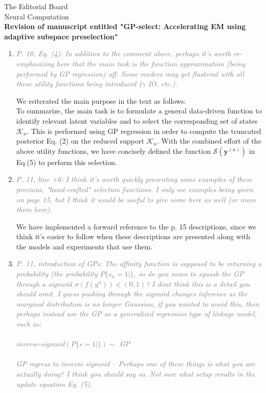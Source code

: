 \documentclass[10pt]{letter}
\newcommand{\rvr}[1]{\textcolor{gray}{#1}}
\renewcommand{\vec}[1]{{\mathbf{#1}}}
\newcommand{\Kn}{\mathcal{K}_{n}}
\begin{document}
\begin{letter}{
The Editorial Board\\
Neural Computation\\
\vspace{10mm}
\textbf{Revision of manuscript entitled "GP-select: Accelerating EM using adaptive
subspace preselection"}
}
\begin{enumerate}[topsep=3pt,itemsep=2ex,partopsep=1ex,parsep=1ex]
For example, let's say that there are five $s_h$, where $h\in \{1,...,5\}$. We consider the case where only $s_1$   and $s_2$   are selected.  The $\mathcal{I}$ function will then return zeros for $s_3$, $s_4$, and $s_5$, but will  return both allowed possibilities $0$ or $1$ for $s_1$ and $s_2$. Thus a valid setting for the entire vector $\vec{s}$ can be $\vec{s}=[0 1 0 0 0]$, but not $\vec{s}=[0 1 1 0 0]$. We have clarified this in the text.

    \item \rvr{\emph{P. 10, Eq. (4): In addition to the comment above, perhaps it's worth re-emphasizing here that the main task is the function approximation (being performed by GP regression) off. Some readers may get flustered with all these utility functions being introduced ($\gamma$ IO, etc.).}}

We reiterated the main purpose in the text as follows:\\
To summarize, the main task is to formulate a general data-driven function to identify relevant latent variables and to select the corresponding set of states
$\Kn$. 
This is performed using GP regression in order to compute the truncated posterior Eq. (2) on the reduced support $\Kn$.
With the combined effort of the above utility functions, we have concisely defined the function $\mathcal{S}(\vec{y}^{(n)})$ in Eq.(5) to perform this selection.

    \item \rvr{\emph{P. 11, line +6: I think it's worth quickly presenting some examples of these previous, "hand-crafted"  selection functions. I only see examples being given on page 15, but I think it would be useful to give some here as well (or move them here).}}

We have implemented a forward reference to the p. 15 descriptions, since we think it's easier to follow when these descriptions are presented along with the models and experiments that use them.


    \item \rvr{\emph{P. 11, introduction of GPs: The affinity function is supposed to be returning a probability (the probability $P \{ s_h = 1 |   \}$, so do you mean to squash the GP through a sigmoid $\sigma(f(y^n)) \in (0,1)$? I dont think this is a detail you should omit. I guess pushing through the sigmoid changes inference as the marginal distribution is no longer Gaussian, if you wanted to avoid this, then perhaps instead use the GP as a generalized regression type of linkage model, such as:\\ \\
inverse-sigmoid$( P\{ s = 1 |   \} ) \sim$ GP \\ \\
GP regress to inverse sigmoid -- Perhaps one of these things is what you are actually doing? I think you should say so.
Not sure what setup results in the update equation 
Eq. (5).}}


\end{enumerate}
\end{letter}
\end{document}
